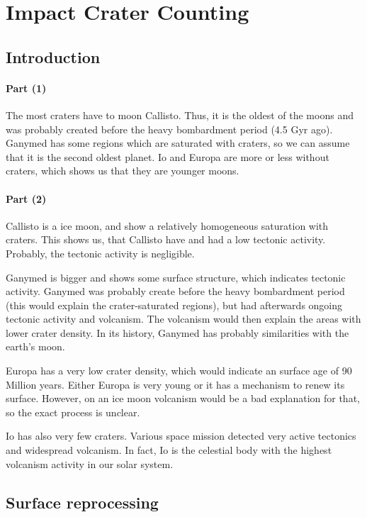 \documentclass[12pt,a4paper]{article}
\begin{document}
\section{Impact Crater Counting}

\subsection{Introduction}

\paragraph{Part (1)}

The most craters have to moon Callisto. Thus, it is the oldest of the moons and was probably created before the heavy bombardment period (4.5 Gyr ago). Ganymed has some regions which are saturated with craters, so we can assume that it is the second oldest planet. Io and Europa are more or less without craters, which shows us that they are younger moons.

\paragraph{Part (2)}

Callisto is a ice moon, and show a relatively homogeneous saturation with craters. This shows us, that Callisto have and had a low tectonic activity. Probably, the tectonic activity is negligible. 

Ganymed is bigger and shows some surface structure, which indicates tectonic activity. Ganymed was probably create before the heavy bombardment period (this would explain the crater-saturated regions), but had afterwards ongoing tectonic activity and volcanism. The volcanism would then explain the areas with lower crater density. In its history, Ganymed has probably similarities with the earth's moon.

Europa has a very low crater density, which would indicate an surface age of 90 Million years. Either Europa is very young or it has a mechanism to renew its surface. However, on an ice moon volcanism would be a bad explanation for that, so the exact process is unclear.

Io has also very few craters. Various space mission detected very active tectonics and widespread volcanism. In fact, Io is the celestial body with the highest volcanism activity in our solar system. 

\subsection{Surface reprocessing}
\end{document}
